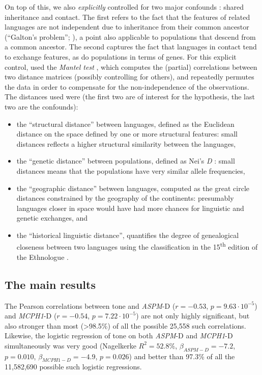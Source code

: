 \documentclass[twoside,onecolumn]{article}
\begin{document}
On top of this, we also \emph{explicitly} controlled for two major confounds \citep{ladd_correlational_2015}: shared inheritance and contact.
The first refers to the fact that the features of related languages are not independent due to inheritance from their common ancestor (``Galton's problem''; \citealp{mace_galtonproblem_1994}), a point also applicable to populations that descend from a common ancestor.
The second captures the fact that languages in contact tend to exchange features, as do populations in terms of genes.
For this explicit control, \citet{dediu_ladd_2007} used the \emph{Mantel test} \citep{mantel_detection_1967}, which computes the (partial) correlations between two distance matrices (possibly controlling for others), and repeatedly permutes the data in order to compensate for the non-independence of the observations.
The distances used were (the first two are of interest for the hypothesis, the last two are the confounds):

\begin{itemize}
	\item the ``structural distance'' between languages, defined as the Euclidean distance on the space defined by one or more structural features: small distances reflects a higher structural similarity between the languages,
	\item the ``genetic distance'' between populations, defined as Nei’s \textit{D} \citep{nei_genetic_1972}: small distances means that the populations have very similar allele frequencies,
	\item the ``geographic distance'' between languages, computed as the great circle distances constrained by the geography of the continents: presumably languages closer in space would have had more chances for linguistic and genetic exchanges, and
	\item the ``historical linguistic distance'', quantifies the degree of genealogical closeness between two languages using the classification in the 15\textsuperscript{th} edition of the Ethnologue \citep{gordon_ethnologue15_2005}.
\end{itemize}

\subsection{The main results}

The Pearson correlations between tone and \textit{ASPM}-D ($r = -0.53$, $p = 9.63\cdot10^{-5}$) and \textit{MCPH1}-D ($r = -0.54$, $p = 7.22\cdot10^{-5}$) are not only highly significant, but also stronger than most (>98.5\%) of all the possible 25,558 such correlations.
Likewise, the logistic regression of tone on both \textit{ASPM}-D and \textit{MCPH1}-D simultaneously was very good (Nagelkerke $R^2 = 52.8\%$, $\beta_{ASPM-D} = -7.2$, $p = 0.010$, $\beta_{MCPH1-D} = -4.9$, $p = 0.026$) and better than 97.3\% of all the 11,582,690 possible such logistic regressions.
\end{document}
